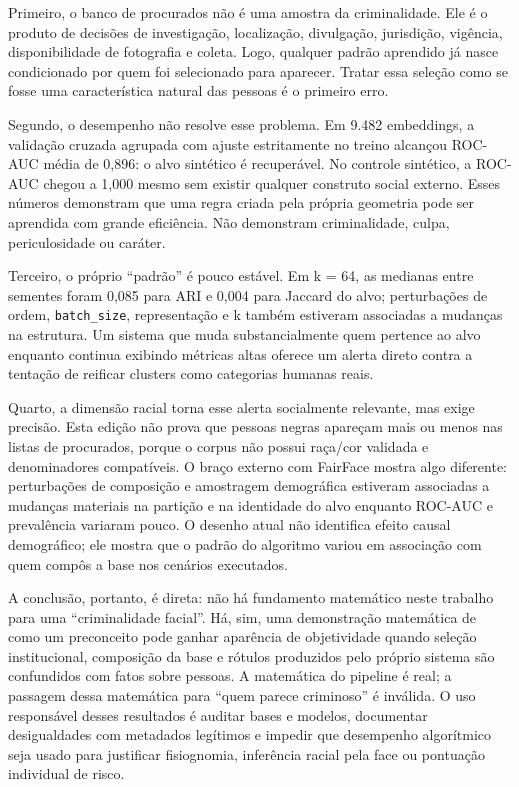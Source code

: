 Primeiro, o banco de procurados não é uma amostra da criminalidade. Ele é o produto de decisões de investigação, localização, divulgação, jurisdição, vigência, disponibilidade de fotografia e coleta. Logo, qualquer padrão aprendido já nasce condicionado por quem foi selecionado para aparecer. Tratar essa seleção como se fosse uma característica natural das pessoas é o primeiro erro.

Segundo, o desempenho não resolve esse problema. Em 9.482 embeddings, a validação cruzada agrupada com ajuste estritamente no treino alcançou ROC-AUC média de 0,896: o alvo sintético é recuperável. No controle sintético, a ROC-AUC chegou a 1,000 mesmo sem existir qualquer construto social externo. Esses números demonstram que uma regra criada pela própria geometria pode ser aprendida com grande eficiência. Não demonstram criminalidade, culpa, periculosidade ou caráter.

Terceiro, o próprio ``padrão'' é pouco estável. Em k = 64, as medianas entre sementes foram 0,085 para ARI e 0,004 para Jaccard do alvo; perturbações de ordem, \texttt{batch\_size}, representação e k também estiveram associadas a mudanças na estrutura. Um sistema que muda substancialmente quem pertence ao alvo enquanto continua exibindo métricas altas oferece um alerta direto contra a tentação de reificar clusters como categorias humanas reais.

Quarto, a dimensão racial torna esse alerta socialmente relevante, mas exige precisão. Esta edição não prova que pessoas negras apareçam mais ou menos nas listas de procurados, porque o corpus não possui raça/cor validada e denominadores compatíveis. O braço externo com FairFace mostra algo diferente: perturbações de composição e amostragem demográfica estiveram associadas a mudanças materiais na partição e na identidade do alvo enquanto ROC-AUC e prevalência variaram pouco. O desenho atual não identifica efeito causal demográfico; ele mostra que o padrão do algoritmo variou em associação com quem compôs a base nos cenários executados.

A conclusão, portanto, é direta: não há fundamento matemático neste trabalho para uma ``criminalidade facial''. Há, sim, uma demonstração matemática de como um preconceito pode ganhar aparência de objetividade quando seleção institucional, composição da base e rótulos produzidos pelo próprio sistema são confundidos com fatos sobre pessoas. A matemática do pipeline é real; a passagem dessa matemática para ``quem parece criminoso'' é inválida. O uso responsável desses resultados é auditar bases e modelos, documentar desigualdades com metadados legítimos e impedir que desempenho algorítmico seja usado para justificar fisiognomia, inferência racial pela face ou pontuação individual de risco.

